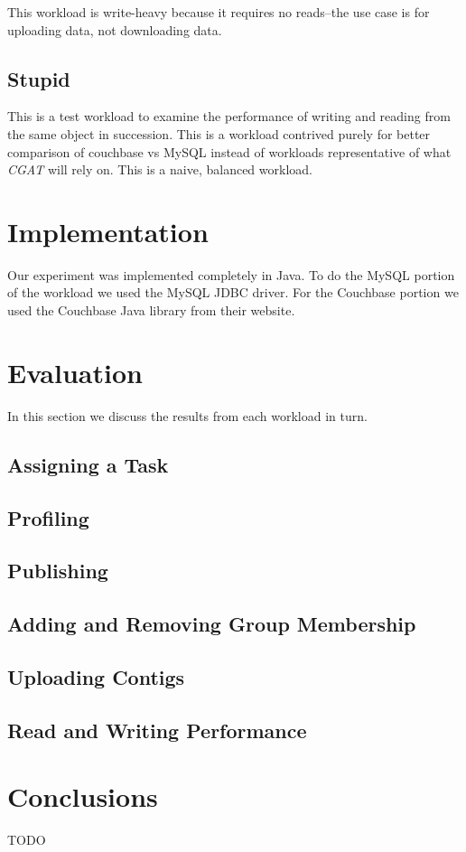 \documentclass[]{IEEEtran}
\begin{document}
This workload is write-heavy because it requires no reads--the use case is for
uploading data, not downloading data.

\subsection{Stupid}
This is a test workload to examine the performance of writing and reading from
the same object in succession. This is a workload contrived purely for better
comparison of couchbase vs MySQL instead of workloads representative of what
\textit{CGAT} will rely on. This is a naive, balanced workload.

\section{Implementation}\label{sec:implementation}
Our experiment was implemented completely in Java. To do the MySQL portion of
the workload we used the MySQL JDBC driver. For the Couchbase portion we used
the Couchbase Java library from their website.

\section{Evaluation}\label{sec:eval}
In this section we discuss the results from each workload in turn.


\subsection{Assigning a Task}

\subsection{Profiling}

\subsection{Publishing}

\subsection{Adding and Removing Group Membership}

\subsection{Uploading Contigs}

\subsection{Read and Writing Performance}

\section{Conclusions}\label{sec:conclusions}
TODO

% 
% 
\end{document}
